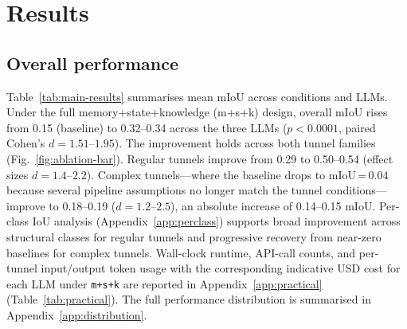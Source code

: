 \documentclass[a4paper,fleqn]{cas-dc}
\begin{document}
{%
\section{Results}\label{sec:results}

\subsection{Overall performance}\label{sec:main-results}

Table~\ref{tab:main-results} summarises mean mIoU across conditions and LLMs. Under the full memory+state+knowledge (m+s+k) design, overall mIoU rises from 0.15 (baseline) to 0.32--0.34 across the three LLMs ($p < 0.0001$, paired Cohen's $d = 1.51$--$1.95$). The improvement holds across both tunnel families (Fig.~\ref{fig:ablation-bar}). Regular tunnels improve from 0.29 to 0.50--0.54 (effect sizes $d = 1.4$--$2.2$). Complex tunnels---where the baseline drops to mIoU\,=\,0.04 because several pipeline assumptions no longer match the tunnel conditions---improve to 0.18--0.19 ($d = 1.2$--$2.5$), an absolute increase of 0.14--0.15 mIoU. Per-class IoU analysis (Appendix~\ref{app:perclass}) supports broad improvement across structural classes for regular tunnels and progressive recovery from near-zero baselines for complex tunnels.  Wall-clock runtime, API-call counts, and per-tunnel input/output token usage with the corresponding indicative USD cost for each LLM under \texttt{m+s+k} are reported in Appendix~\ref{app:practical} (Table~\ref{tab:practical}). The full performance distribution is summarised in Appendix~\ref{app:distribution}.

}
\end{document}
